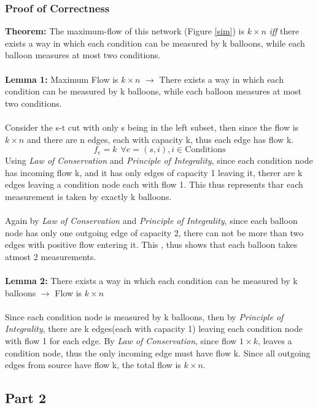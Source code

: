 \documentclass{article}
\begin{document}
\subsubsection{Proof of Correctness}
\textbf{Theorem: } The maximum-flow of this network (Figure \ref{sim}) is $k \times n$ \emph{iff} there exists a way in which each condition can be measured by k balloons, while each balloon measures at most two conditions.\\ \\
\textbf{Lemma 1:} Maximum Flow is $k \times n$ $ \rightarrow $ There exists a way in which each condition can be measured by k balloons, while each balloon measures at most two conditions.\\ \\
Consider the s-t cut with only s being in the left subset, then since the flow is $k \times n$ and there are n edges, each with capacity k, thus each edge has flow k. 
$$ f_e = k \hspace{5pt}\forall e=(s,i), i \in \text{Conditions}$$
Using \emph{Law of Conservation} and \emph{Principle of Integrality}, since each condition node has incoming flow k, and it has only edges of capacity 1 leaving it, therer are k edges leaving a condition node each with flow 1. This thus represents thar each measurement is taken by exactly k balloons.\\ \\
Again by \emph{Law of Conservation} and \emph{Principle of Integrality}, since each balloon node has only one outgoing edge of capacity 2, there can not be more than two edges with positive flow entering it. This , thus shows that each balloon takes atmost 2 measurements. \\ \\
\textbf{Lemma 2:} There exists a way in which each condition can be measured by k balloons $ \rightarrow $  Flow is $k \times n$ \\ \\
Since each condition node is measured by k balloons, then by \emph{Principle of Integrality}, there are k edges(each with capacity 1) leaving each condition node with flow 1 for each edge. By \emph{Law of Conservation}, since flow $1 \times k $, leaves a condition node, thus the only incoming edge must have flow k. Since all outgoing edges from source have flow k, the total flow is $k \times n$.
\subsection{Part 2}
\end{document}
